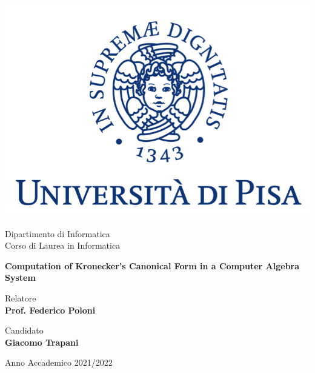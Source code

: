 \documentclass[12pt]{report}
\theoremstyle{definition}
\theoremstyle{definition}
\begin{document}
\begin{titlepage}
    \clearpage\thispagestyle{empty}
    \centering
    \vspace{1cm}

    \includegraphics[scale=0.60]{images/unipi-logo.png}

    {\normalsize \noindent Dipartimento di Informatica \\
            Corso di Laurea in Informatica \par}
    
    \vspace{2cm}
    {\huge \textbf{Computation of Kronecker's Canonical Form in a Computer Algebra System} \par }

    \vspace{3cm}

    \begin{minipage}[t]{0.47\textwidth}
        {\large{Relatore \\ \textbf{Prof. Federico Poloni}}}
    \end{minipage}\hfill\begin{minipage}[t]{0.47\textwidth}\raggedleft
        {\large {Candidato \\ \textbf{Giacomo Trapani}}}
    \end{minipage}

    \vspace{3cm}

    {\normalsize Anno Accademico 2021/2022 \par}

    \pagebreak
\end{titlepage}
\setcounter{chapter}{-1}
\tableofcontents
\pagebreak

\pagebreak

\pagebreak

\pagebreak

\pagebreak

\pagebreak

\end{document}

